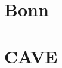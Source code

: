 \documentclass{article}
\begin{document}
\tableofcontents
\clearpage



\section{Bonn}



\section{CAVE}


\end{document}
